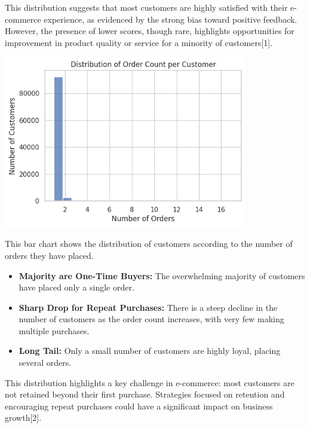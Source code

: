 \documentclass[a4paper]{article}
\begin{document}
\begin{multicols}{2}
This distribution suggests that most customers are highly satisfied with their e-commerce experience, as evidenced by the strong bias toward positive feedback. However, the presence of lower scores, though rare, highlights opportunities for improvement in product quality or service for a minority of customers[1].

\vspace{1em}

\noindent
\begin{minipage}{\columnwidth}
\centering
\includegraphics[width=0.8\textwidth]{Distribution of Order Count per Customer.png}
\label{fig:order_count_per_customer}
\end{minipage}

This bar chart shows the distribution of customers according to the number of orders they have placed.

\begin{itemize}
    \item \textbf{Majority are One-Time Buyers:} The overwhelming majority of customers have placed only a single order.
    \item \textbf{Sharp Drop for Repeat Purchases:} There is a steep decline in the number of customers as the order count increases, with very few making multiple purchases.
    \item \textbf{Long Tail:} Only a small number of customers are highly loyal, placing several orders.
\end{itemize}

This distribution highlights a key challenge in e-commerce: most customers are not retained beyond their first purchase. Strategies focused on retention and encouraging repeat purchases could have a significant impact on business growth[2].


\end{multicols}
\end{document}
